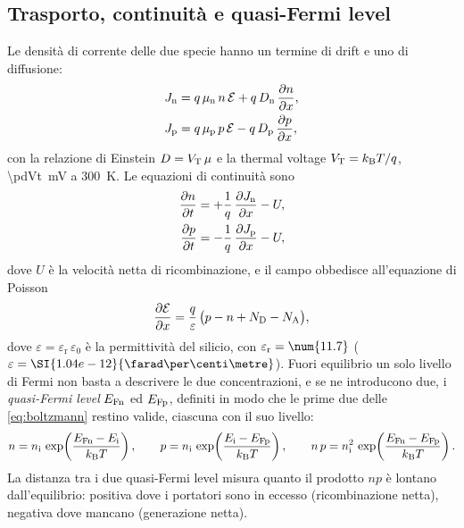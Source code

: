 \documentclass[10pt,a4paper]{scrartcl}
\let\newcommand\pdvaluedefine
\newcommand{\VT}{V_\mathrm{T}}
\newcommand{\Ef}{\mathcal{E}}                 %
\newcommand{\ND}{N_\mathrm{D}}
\newcommand{\NA}{N_\mathrm{A}}
\newcommand{\nint}{n_\mathrm{i}}
\newcommand{\Dn}{D_\mathrm{n}}
\newcommand{\Dp}{D_\mathrm{p}}
\newcommand{\mun}{\mu_\mathrm{n}}
\newcommand{\mup}{\mu_\mathrm{p}}
\newcommand{\Jn}{J_\mathrm{n}}
\newcommand{\Jp}{J_\mathrm{p}}
\newcommand{\kB}{k_\mathrm{B}}
\newcommand{\EFn}{E_\mathrm{Fn}}
\newcommand{\EFp}{E_\mathrm{Fp}}
\newcommand{\dpar}[2]{\frac{\partial #1}{\partial #2}}
\begin{document}
\subsection{Trasporto, continuità e quasi-Fermi level}
\label{sec:transport}
Le densità di corrente delle due specie hanno un termine di drift e uno di diffusione:
\begin{align}
\Jn &= q\,\mun\,n\,\Ef + q\,\Dn\,\dpar{n}{x} , \label{eq:jn}\\
\Jp &= q\,\mup\,p\,\Ef - q\,\Dp\,\dpar{p}{x} , \label{eq:jp}
\end{align}
con la relazione di Einstein $D = \VT\,\mu$ e la thermal voltage $\VT = \kB T/q$, \SI{\pdVt}{\milli\volt} a \SI{300}{\kelvin}. Le equazioni di continuità sono
\begin{align}
\dpar{n}{t} &= +\frac{1}{q}\,\dpar{\Jn}{x} - U , \label{eq:contn}\\
\dpar{p}{t} &= -\frac{1}{q}\,\dpar{\Jp}{x} - U , \label{eq:contp}
\end{align}
dove $U$ è la velocità netta di ricombinazione, e il campo obbedisce all'equazione di Poisson
\begin{equation}
\dpar{\Ef}{x} = \frac{q}{\varepsilon}\,\bigl(p - n + \ND - \NA\bigr) ,
\label{eq:poisson}
\end{equation}
dove $\varepsilon = \varepsilon_\mathrm{r}\,\varepsilon_0$ è la permittività del silicio, con $\varepsilon_\mathrm{r} = \num{\pdEpsR}$ ($\varepsilon = \SI{\pdEpsFcm e-12}{\farad\per\centi\metre}$). Fuori equilibrio un solo livello di Fermi non basta a descrivere le due concentrazioni, e se ne introducono due, i \emph{quasi-Fermi level} $\EFn$ ed $\EFp$, definiti in modo che le prime due delle \eqref{eq:boltzmann} restino valide, ciascuna con il suo livello:
\begin{equation}
n = \nint\,\exp\!\left(\frac{\EFn - E_\mathrm{i}}{\kB T}\right) , \qquad
p = \nint\,\exp\!\left(\frac{E_\mathrm{i} - \EFp}{\kB T}\right) , \qquad
n\,p = \nint^2\,\exp\!\left(\frac{\EFn - \EFp}{\kB T}\right) .
\label{eq:qfl}
\end{equation}
La distanza tra i due quasi-Fermi level misura quanto il prodotto $np$ è lontano dall'equilibrio: positiva dove i portatori sono in eccesso (ricombinazione netta), negativa dove mancano (generazione netta).
\end{document}
